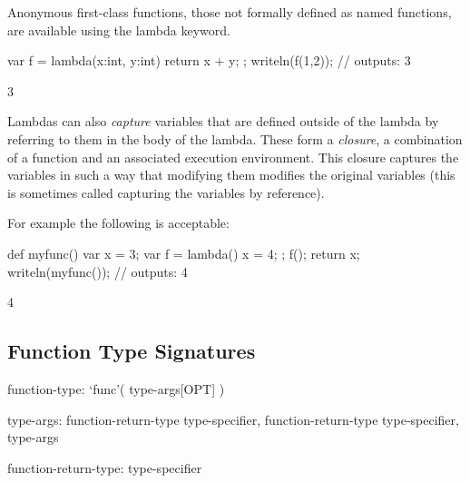 Anonymous first-class functions, those not formally defined as named functions, are  available using the lambda keyword.

\begin{example}
\begin{chapelpre}
\end{chapelpre}
\begin{chapel}
var f = lambda(x:int, y:int) { return x + y; };
writeln(f(1,2)); // outputs: 3
\end{chapel}
\begin{chapeloutput}
3
\end{chapeloutput}
\end{example}


Lambdas can also \textit{capture} variables that are defined outside of the lambda by referring to them in the body of the lambda.  These form a \textit{closure}, a combination of a function and an associated execution environment.  This closure captures the variables in such a way that modifying them modifies the original variables (this is sometimes called capturing the variables by reference).  

\begin{example}
For example the following is acceptable:
\begin{chapelpre}
\end{chapelpre}
\begin{chapel}
def myfunc() {
  var x = 3;
  var f = lambda() { x = 4; };
  f();
  return x;
}
writeln(myfunc()); // outputs: 4
\end{chapel}
\begin{chapeloutput}
4
\end{chapeloutput}
\end{example}

\subsection{Function Type Signatures}
\label{Function_Type_Signatures}

\begin{syntax}
function-type:
  `func'( type-args[OPT] )

type-args:
  function-return-type
  type-specifier, function-return-type
  type-specifier, type-args

function-return-type:
  type-specifier
  
\end{syntax}

